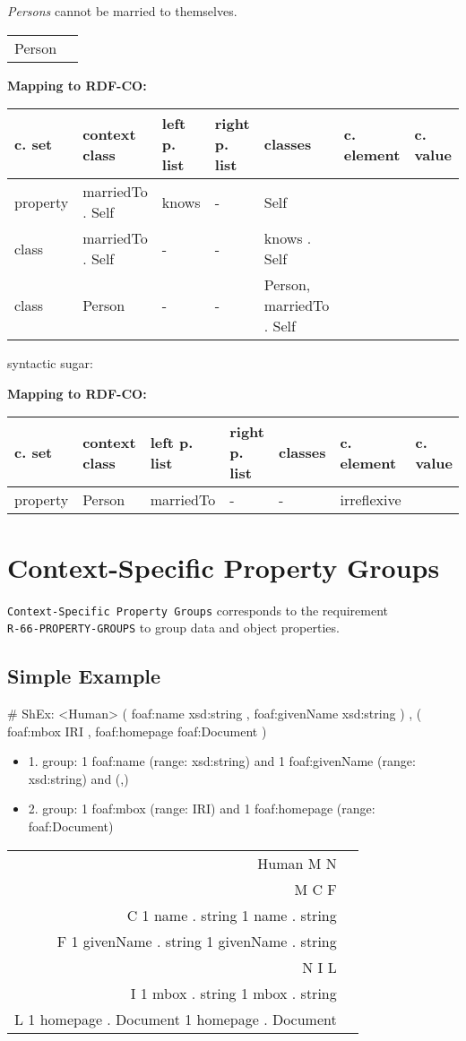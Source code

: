 \documentclass{llncs}
\newcommand{\ms}[1]{\texttt{#1}}
\newenvironment{gcotable}{
  \scriptsize
  \sffamily
  \vspace{0cm}
	\begin{center}
	\textbf{\vspace{0.4cm}Mapping to RDF-CO:} \\
  \begin{tabular}{l|l|l|l|l|l|l}
	\hline
  \textbf{c. set} & \textbf{context class} & \textbf{left p. list} & \textbf{right p. list} & \textbf{classes} & \textbf{c. element} & \textbf{c. value} \\
  \hline

}{
  \hline
  \end{tabular}
	\end{center}
}
\newenvironment{DL}{
\vspace{0cm}
	\begin{center}
  \begin{tabular}{r l}

}{
  \end{tabular}
	\end{center}
}
\begin{document}
\emph{Persons} cannot be married to themselves.

\begin{DL}
Person    
\end{DL}

\begin{gcotable}
property &  marriedTo . Self & knows & - & Self &  \\
class &   marriedTo . Self & - & - &  knows . Self &  \\
class & Person & - & - & Person,   marriedTo . Self &  \\
\end{gcotable}

syntactic sugar:

\begin{gcotable}
property & Person & marriedTo & - & - & irreflexive \\
\end{gcotable}

\section{Context-Specific Property Groups}

\ms{Context-Specific Property Groups} corresponds to the requirement \\
\ms{R-66-PROPERTY-GROUPS} to group data and object properties.

\subsection{Simple Example}

\begin{ex}
# ShEx:
<Human> { 
    (  
        foaf:name xsd:string ,
        foaf:givenName xsd:string 
    ) ,
    (
        foaf:mbox IRI ,
        foaf:homepage foaf:Document
    ) }
\end{ex}

\begin{itemize}
	\item 1. group: 1 foaf:name (range: xsd:string) and 1 foaf:givenName (range: xsd:string) and (,)
	\item 2. group: 1 foaf:mbox (range: IRI) and 1 foaf:homepage (range: foaf:Document) 
\end{itemize}


\begin{DL}
Human  M  N \\
M  C  F \\
C   1 name . string   1 name . string \\
F   1 givenName . string   1 givenName . string \\
N  I  L \\
I   1 mbox . string   1 mbox . string \\
L   1 homepage . Document   1 homepage . Document \\
\end{DL}
\end{document}
